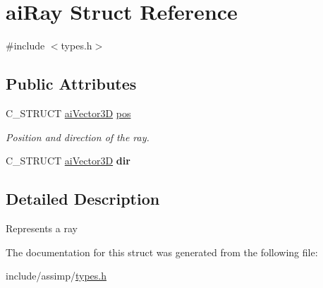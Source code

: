 \hypertarget{structaiRay}{\section{ai\-Ray \-Struct \-Reference}
\label{structaiRay}
}


{\ttfamily \#include $<$types.\-h$>$}

\subsection*{\-Public \-Attributes}
\begin{DoxyCompactItemize}
\item 
\hypertarget{structaiRay_a312f663a7d2580b1b3beb52ffd4ab4c9}{\-C\-\_\-\-S\-T\-R\-U\-C\-T \hyperlink{structaiVector3D}{ai\-Vector3\-D} \hyperlink{structaiRay_a312f663a7d2580b1b3beb52ffd4ab4c9}{pos}}\label{structaiRay_a312f663a7d2580b1b3beb52ffd4ab4c9}

\begin{DoxyCompactList}\small\item\em \-Position and direction of the ray. \end{DoxyCompactList}\item 
\hypertarget{structaiRay_a635d9120af2654716e5e7952d837282b}{\-C\-\_\-\-S\-T\-R\-U\-C\-T \hyperlink{structaiVector3D}{ai\-Vector3\-D} {\bfseries dir}}\label{structaiRay_a635d9120af2654716e5e7952d837282b}

\end{DoxyCompactItemize}


\subsection{\-Detailed \-Description}
\-Represents a ray 

\-The documentation for this struct was generated from the following file\-:\begin{DoxyCompactItemize}
\item 
include/assimp/\hyperlink{types_8h}{types.\-h}\end{DoxyCompactItemize}
